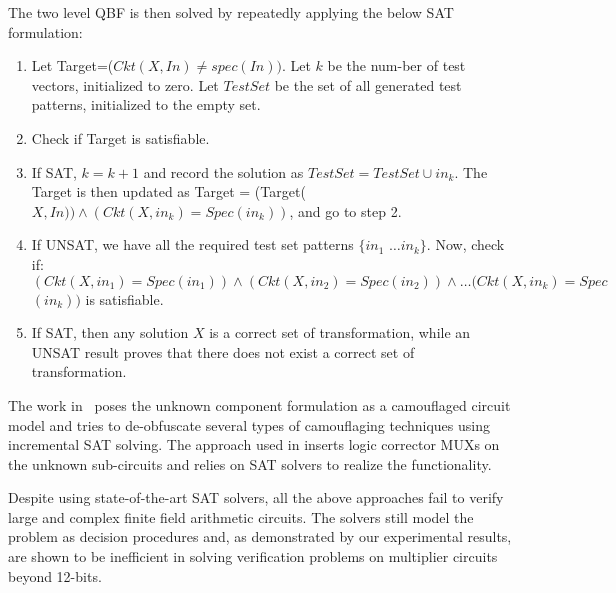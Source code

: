 The two level QBF is then solved by repeatedly applying the below SAT formulation:
  
\begin{enumerate}
	\item Let Target=($Ckt(X,In)\neq spec(In))$. Let $k$ be the num-ber of test vectors, initialized to zero. Let $TestSet$ be the set of all generated test patterns, initialized to the empty set.
	\item Check if Target is satisfiable.
	\item If SAT, $k=k+1$ and record the solution as $TestSet = TestSet \cup in_k$. The Target is then updated as Target = (Target($X,In))\land(Ckt(X,in_k)=Spec(in_k))$, and go to step 2.
    \item If UNSAT, we have all the required test set patterns $\{in_1$ $\dots in_k\}$. Now, check if: $(Ckt(X,in_1) = Spec(in_1)) \land (Ckt(X,in_2) = Spec(in_2)) \land \dots (Ckt(X,in_k) = Spec$ $(in_k))$ is satisfiable.
    \item If SAT, then any solution $X$ is a correct set of transformation, while an UNSAT result proves that there does not exist a correct set of transformation.
\end{enumerate}

The work in~\cite{maciej:2017} poses the unknown component formulation as a camouflaged circuit model and tries to de-obfuscate several types of camouflaging techniques using incremental SAT solving. The approach used in \cite{andreas:2005} inserts logic corrector MUXs on the unknown sub-circuits and relies on SAT solvers to realize the functionality. 

Despite using state-of-the-art SAT solvers, all the above approaches fail to verify large and complex finite field arithmetic circuits. The solvers still model the problem as decision procedures and, as demonstrated by our experimental results, are shown to be inefficient in solving verification problems on multiplier circuits beyond 12-bits. 

